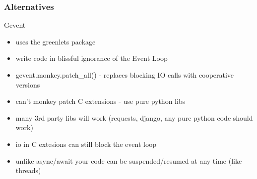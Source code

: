 \documentclass{beamer}
\begin{document}
\begin{frame}
  \frametitle{Alternatives}
  Gevent
  \begin{itemize}
    \item uses the greenlets package
    \item write code in blissful ignorance of the Event Loop
    \item gevent.monkey.patch\_all() - replaces blocking IO calls with cooperative versions
    \item can't monkey patch C extensions - use pure python libs
    \item many 3rd party libs will work (requests, django, any pure python code should work)
    \item io in C extesions can still block the event loop
    \item unlike async/await your code can be suspended/resumed at any time (like threads)
  \end{itemize}
\end{frame}
\end{document}
